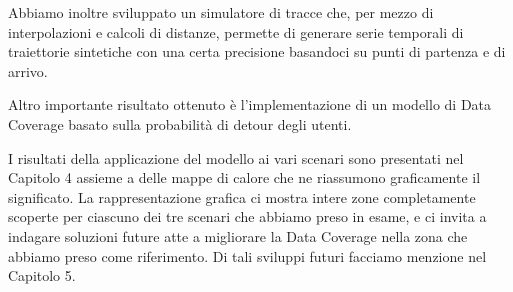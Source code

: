 Abbiamo inoltre sviluppato un simulatore di tracce che, per mezzo di interpolazioni e calcoli di distanze, permette di generare serie temporali di traiettorie sintetiche con una certa precisione basandoci su punti di partenza e di arrivo.

Altro importante risultato ottenuto è l'implementazione di un modello di Data Coverage basato sulla probabilità di detour degli utenti. 

I risultati della applicazione del modello ai vari scenari sono presentati nel Capitolo 4 assieme a delle mappe di calore che ne riassumono graficamente il significato. La rappresentazione grafica ci mostra intere zone completamente scoperte per ciascuno dei tre scenari che abbiamo preso in esame, e ci invita a indagare soluzioni future atte a migliorare la Data Coverage nella zona che abbiamo preso come riferimento.
Di tali sviluppi futuri facciamo menzione nel Capitolo 5.
